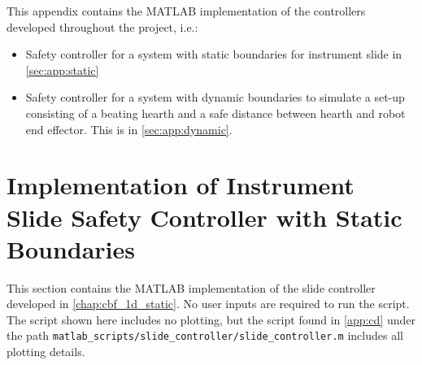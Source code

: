 This appendix contains the MATLAB implementation of the controllers developed throughout the project, i.e.:
\begin{itemize}
\item Safety controller for a system with static boundaries for instrument slide in \autoref{sec:app:static}
\item Safety controller for a system with dynamic boundaries to simulate a set-up consisting of a beating hearth and a safe distance between hearth and robot end effector. This is in \autoref{sec:app:dynamic}.
\end{itemize}
\section{Implementation of Instrument Slide Safety Controller with Static Boundaries}\label{sec:app:static}
This section contains the MATLAB implementation of the slide controller developed in \autoref{chap:cbf_1d_static}. No user inputs are required to run the script. The script shown here includes no plotting, but the script found in \autoref{app:cd} under the path \texttt{matlab\_scripts/slide\_controller/slide\_controller.m} includes all plotting details.\\

